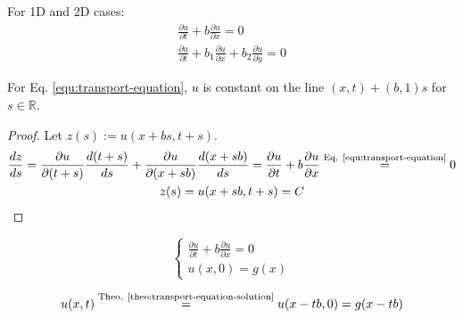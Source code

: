 \documentclass{article}
\begin{document}
\begin{example}
    For 1D and 2D cases:
    \begin{gather*}
        \frac{\partial u}{\partial t} + b \frac{\partial u}{\partial x} = 0 \\
        \frac{\partial u}{\partial t} + b_{1} \frac{\partial u}{\partial x} + b_{2} \frac{\partial u}{\partial y} = 0
    \end{gather*}
\end{example}

\begin{theorem}
    \label{theo:transport-equation-solution}
    For Eq. \ref{equ:transport-equation}, $u$ is constant on the line $(x,t) + (b,1)s$ for $s \in \mathbb{R}$.
\end{theorem}

\begin{proof}
    Let $z(s) := u(x+bs,t+s)$.
    \begin{gather*}
        \frac{dz}{ds} = \frac{\partial u}{\partial (t+s)}\frac{d(t+s)}{ds} + \frac{\partial u}{\partial (x+sb)}\frac{d (x+sb)}{ds}
        = \frac{\partial u}{\partial t} + b\frac{\partial u}{\partial x}
        \overset{\text{Eq. \ref{equ:transport-equation}}}{=} 0 \\
        z(s) = u(x+sb,t+s) = C
    \end{gather*}
\end{proof}

\begin{proposition}
    \begin{equation*}
        \begin{cases}
            \frac{\partial u}{\partial t} + b\frac{\partial u}{\partial x} = 0 \\
            u(x,0) = g(x)
        \end{cases}
    \end{equation*}

    \begin{equation*}
        u(x,t) \overset{\text{Theo. \ref{theo:transport-equation-solution}}}{=} u(x-tb,0) = g(x-tb)
    \end{equation*}
\end{proposition}
\end{document}
